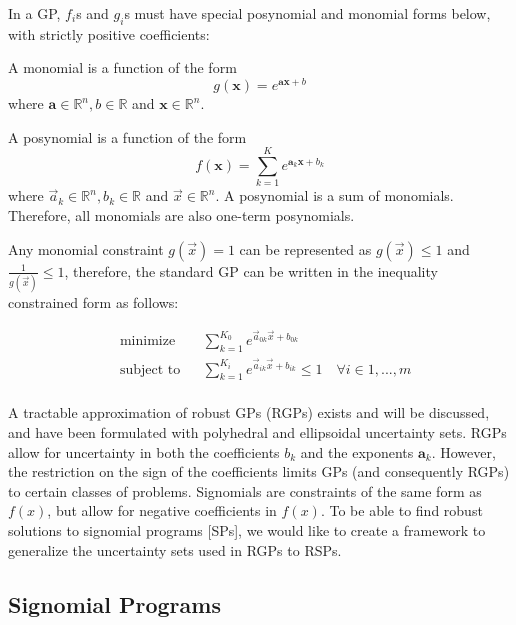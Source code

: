 In a GP, $f_{i}$s and $g_{i}$s must have special posynomial and monomial forms below, with strictly positive coefficients:

A monomial is a function of the form
\begin{equation}\label{e:monomial}
g(\mathbf{x}) = e^{\mathbf{a}\mathbf{x} + b}
\end{equation}
where $\mathbf{a} \in \mathbb{R}^n, b \in \mathbb{R}$ and $\mathbf{x} \in \mathbb{R}^n$.

A posynomial is a function of the form
\begin{equation}\label{e:posynomial}
f(\mathbf{x}) = \sum_{k=1}^{K}e^{\mathbf{a}_k\mathbf{x} + b_k}
\end{equation}
where $\vec{a}_k \in \mathbb{R}^n, b_k \in \mathbb{R}$ and $\vec{x} \in \mathbb{R}^n$. A posynomial is a sum of monomials. Therefore, all monomials are also one-term posynomials.

Any monomial constraint $g(\vec{x}) = 1$ can be represented as $g(\vec{x}) \leq 1$ and $\frac{1}{g(\vec{x})} \leq 1$, therefore, the standard GP can be written in the inequality constrained form as follows:

\begin{equation}
\begin{aligned}
& \text{minimize} && \textstyle{\sum}_{k=1}^{K_0}e^{\vec{a}_{0k}\vec{x} + b_{0k}} \\
& \text{subject to} && \textstyle{\sum}_{k=1}^{K_i}e^{\vec{a}_{ik}\vec{x} + b_{ik}} \leq 1 \quad \forall i \in 1,...,m\\
\end{aligned}
\label{GP_inequality}
\end{equation}

A tractable approximation of robust GPs (RGPs) exists and will be discussed, and have been formulated with polyhedral and ellipsoidal uncertainty sets. RGPs allow for uncertainty in both the coefficients $b_k$ and the exponents $\mathbf{a}_{k}$. However, the restriction on the sign of the coefficients limits GPs (and consequently RGPs) to certain classes of problems. Signomials are constraints of the same form as $f(x)$, but allow for negative coefficients in $f(x)$. To be able to find robust solutions to signomial programs [SPs], we would like to create a framework to generalize the uncertainty sets used in RGPs to RSPs.


\subsection{Signomial Programs}

